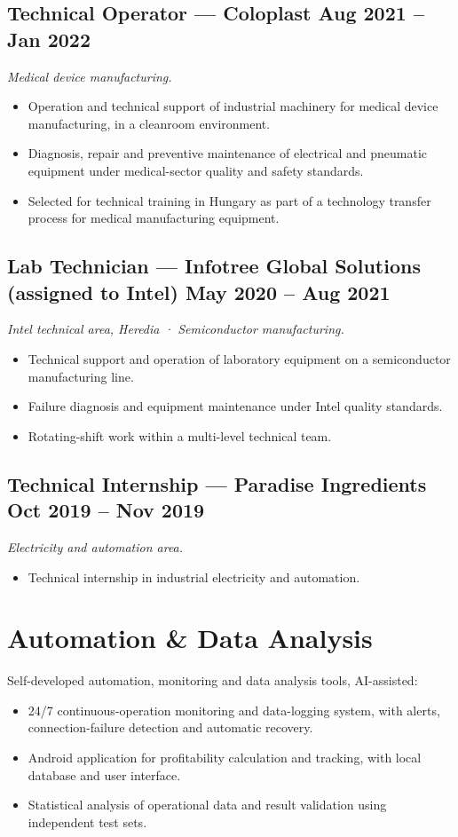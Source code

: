 \documentclass[10.5pt]{article}
\begin{document}
\subsection*{Technical Operator --- Coloplast \hfill Aug 2021 -- Jan 2022}
\textit{Medical device manufacturing.}
\begin{itemize}
\item Operation and technical support of industrial machinery for medical device manufacturing, in a cleanroom environment.
\item Diagnosis, repair and preventive maintenance of electrical and pneumatic equipment under medical-sector quality and safety standards.
\item Selected for technical training in Hungary as part of a technology transfer process for medical manufacturing equipment.
\end{itemize}

\subsection*{Lab Technician --- Infotree Global Solutions (assigned to Intel) \hfill May 2020 -- Aug 2021}
\textit{Intel technical area, Heredia · Semiconductor manufacturing.}
\begin{itemize}
\item Technical support and operation of laboratory equipment on a semiconductor manufacturing line.
\item Failure diagnosis and equipment maintenance under Intel quality standards.
\item Rotating-shift work within a multi-level technical team.
\end{itemize}

\subsection*{Technical Internship --- Paradise Ingredients \hfill Oct 2019 -- Nov 2019}
\textit{Electricity and automation area.}
\begin{itemize}
\item Technical internship in industrial electricity and automation.
\end{itemize}

\section*{Automation \& Data Analysis}
Self-developed automation, monitoring and data analysis tools, AI-assisted:
\begin{itemize}
\item 24/7 continuous-operation monitoring and data-logging system, with alerts, connection-failure detection and automatic recovery.
\item Android application for profitability calculation and tracking, with local database and user interface.
\item Statistical analysis of operational data and result validation using independent test sets.
\end{itemize}
\end{document}
